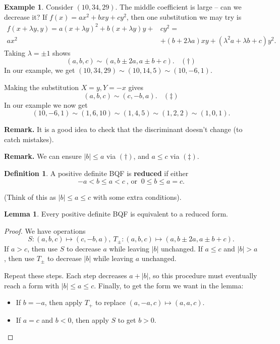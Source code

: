 \documentclass{article}
\theoremstyle{definition}
\newtheorem{lemma}[theorem]{Lemma}
\newtheorem{example}{Example}[section]
\newtheorem{defn}{Definition}[section]
\begin{document}
\begin{example}
    Consider $(10,34,29)$. The middle coefficient is large -- can we decrease it? If $f(x) = ax^2+bxy+cy^2$, then one substitution we may try is 
    \begin{align*}
        f(x+\lambda y,y)=a(x+\lambda y)^2+ b(x + \lambda y)y + &cy^2 = \\ 
        ax^2 &+ (b+2\lambda a)xy + (\lambda^2 a + \lambda b + c)y^2.
    \end{align*}
    Taking $\lambda = \pm 1$ shows $$(a,b,c) \sim (a,b \pm 2a, a \pm b + c). ~~~~(\dagger)$$
    In our example, we get $(10,34,29) \sim (10,14,5) \sim (10, -6, 1)$.

    Making the substitution $X=y, Y=-x$ gives $$(a,b,c) \sim (c,-b, a). ~~~~ (\ddagger)$$ In our example we now get $$(10,-6,1) \sim (1, 6, 10) \sim (1,4, 5) \sim (1,2,2) \sim (1,0,1).$$
\end{example}
\textbf{Remark.} It is a good idea to check that the discriminant doesn't change (to catch mistakes).

\textbf{Remark.} We can ensure $|b|\le a$ via $(\dagger)$, and $a\le c$ via $(\ddagger)$.
\begin{defn}
    A positive definite BQF is \textbf{reduced} if either \[
    -a < b \le a < c ~\text{, or } ~ 0\le b \le a = c.
    \]
\end{defn}
(Think of this as $|b|\le a \le c$ with some extra conditions).
\begin{lemma}\label{4.5}
    Every positive definite BQF is equivalent to a reduced form.
\end{lemma}
\begin{proof}
    We have operations $$S : (a,b,c) \mapsto (c, -b, a), ~T_{\pm}:(a,b,c) \mapsto (a, b \pm 2a, a \pm b +c).$$
    If $a>c$, then use $S$ to decrease $a$ while leaving $|b|$ unchanged. If $a\le c$ and $|b|>a$, then use $T_{\pm}$ to decrease $|b|$ while leaving $a$ unchanged. 
    
    Repeat these steps. Each step decreases $a + |b|$, so this procedure must eventually reach a form with $|b|\le a\le c$. Finally, to get the form we want in the lemma:

    \begin{itemize}
        \item If $b=-a$, then apply $T_+$ to replace $(a,-a,c) \mapsto (a, a, c)$.
        \item If $a=c$ and $b<0$, then apply $S$ to get $b>0$.
    \end{itemize}
\end{proof}
\end{document}

